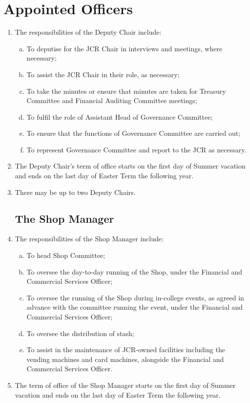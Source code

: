 \documentclass[12pt]{article}
\begin{document}
\section{Appointed Officers}
\begin{enumerate}
    \subsection{The Deputy Chair}
    \item The responsibilities of the Deputy Chair include:
    \begin{enumerate}[(a)]
        \item To deputise for the JCR Chair in interviews and meetings, where necessary;
        \item To assist the JCR Chair in their role, as necessary;
        \item To take the minutes or ensure that minutes are taken for Treasury Committee and Financial Auditing Committee meetings;
        \item To fulfil the role of Assistant Head of Governance Committee;
        \item To ensure that the functions of Governance Committee are carried out;
        \item To represent Governance Committee and report to the JCR as necessary.
    \end{enumerate}
    \item The Deputy Chair's term of office starts on the first day of Summer vacation and ends on the last day of Easter Term the following year.
    \item There may be up to two Deputy Chairs.
    \subsection{The Shop Manager}
    \item The responsibilities of the Shop Manager include:
    \begin{enumerate}[(a)]
        \item To head Shop Committee;
        \item To oversee the day-to-day running of the Shop, under the Financial and Commercial Services Officer;
        \item To oversee the running of the Shop during in-college events, as agreed in advance with the committee running the event, under the Financial and Commercial Services Officer;
        \item To oversee the distribution of stash;
        \item To assist in the maintenance of JCR-owned facilities including the vending machines and card machines, alongside the Financial and Commercial Services Officer.
    \end{enumerate}
    \item The term of office of the Shop Manager starts on the first day of Summer vacation and ends on the last day of Easter Term the following year.

\end{enumerate}
\end{document}
